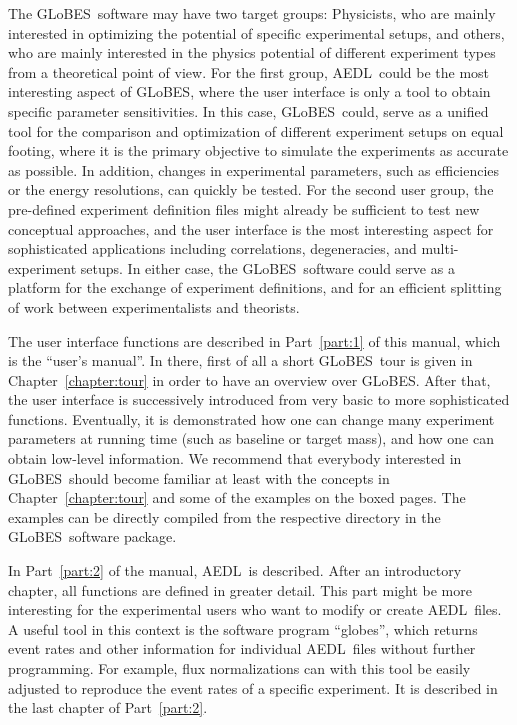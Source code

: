 \documentclass[a4paper,12pt,twoside]{book}
\newcommand{\Chapt}{Chapter}
\newcommand{\Part}{Part}
\newcommand{\GLOBES}{{\sf GLoBES}}
\newcommand{\AEDL}{{\sf AEDL}}
\begin{document}
The \GLOBES\ software may have two target groups: 
Physicists, who are mainly interested in optimizing the potential
of specific experimental setups, and others, who are mainly
interested in the physics potential of different experiment types
from a theoretical point of view.
For the first group, \AEDL\ could be the most interesting aspect of
\GLOBES , where the user interface is only a tool to obtain specific
parameter sensitivities. In this case, \GLOBES\ could, serve as a
unified tool for the comparison and optimization of different experiment
 setups on equal footing, where
it is the primary objective to simulate the experiments as accurate
as possible. In addition, changes in experimental parameters, such as
efficiencies or the energy resolutions, can quickly be tested.
%
For the second user group, the pre-defined 
experiment definition files might already be sufficient to test
new conceptual approaches, and the user interface is the most interesting
aspect for sophisticated applications including correlations,
degeneracies, and multi-experiment setups. In either case, the \GLOBES\
software could serve as a platform for the exchange of experiment
definitions, and for an efficient splitting of work between
experimentalists and theorists.

The user interface functions are described in \Part~\ref{part:1} of 
this manual, which is the ``user's manual''. In there, first of all a 
short \GLOBES\ tour is given in \Chapt~\ref{chapter:tour} in order to 
have an overview over \GLOBES . 
After that, the user
interface is successively introduced from very basic to more sophisticated
functions. Eventually, it is demonstrated how one can change many
experiment parameters at running time (such as baseline or target mass), and how one can obtain low-level
information. We recommend that everybody interested in \GLOBES\ should
become familiar at least with the concepts in \Chapt~\ref{chapter:tour}
 and some of the examples on the boxed pages. The examples can be 
 directly compiled 
 from the respective directory in the \GLOBES\ software package.

In \Part~\ref{part:2} of the manual, \AEDL\ is described. After an
introductory chapter, all functions are defined in greater detail.
This part might be more interesting for the experimental users who
want to modify or create \AEDL\ files. A useful tool in this context
is the software program ``globes'', which returns event rates and other
information for individual \AEDL\ files without further programming. 
For example, flux normalizations can with this tool be easily adjusted 
to reproduce the event rates of a specific experiment. It is described
in the last chapter of \Part~\ref{part:2}.
\end{document}
